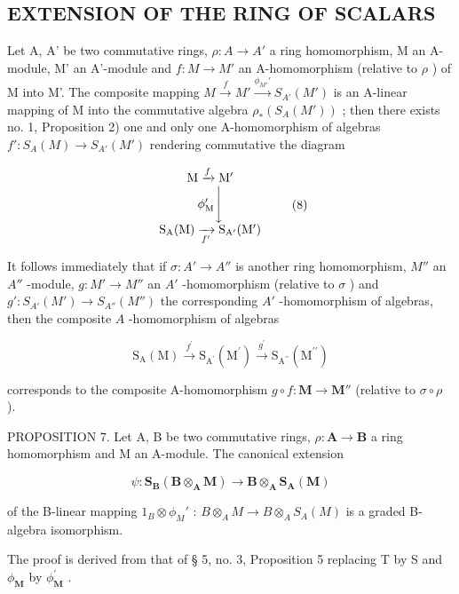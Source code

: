 \subsection{EXTENSION OF THE RING OF SCALARS}

Let A, A' be two commutative rings, \(\rho: A \to A'\) a ring homomorphism, M an A-module, M' an A'-module and \(f: M \to M'\) an A-homomorphism (relative to \(\rho\) ) of M into M'. The composite mapping \(M \xrightarrow{f} M' \xrightarrow{\phi_{M'}'} S_{A'}(M')\) is an A-linear mapping of M into the commutative algebra \(\rho_*(S_A(M'))\) ; then there exists no. 1, Proposition 2) one and only one A-homomorphism of algebras \(f': S_A(M) \to S_{A'}(M')\) rendering commutative the diagram

\[
\begin{array}{c} \mathrm{M} \xrightarrow {f} \mathrm{M} ^ {\prime} \\ \phi_ {\mathrm{M}} ^ {\prime} \Biggl \downarrow \\ \mathrm{S} _ {\mathrm{A}} (\mathrm{M}) \xrightarrow [ f ^ {\prime} ]{} \mathrm{S} _ {\mathrm{A} ^ {\prime}} (\mathrm{M} ^ {\prime}) \end{array}\tag{8}
\]

It follows immediately that if \(\sigma: A' \to A''\) is another ring homomorphism, \(M''\) an \(A''\) -module, \(g: M' \to M''\) an \(A'\) -homomorphism (relative to \(\sigma\) ) and \(g': S_{A'}(M') \to S_{A''}(M'')\) the corresponding \(A'\) -homomorphism of algebras, then the composite \(A\) -homomorphism of algebras

\[
\mathrm{S} _ {\mathrm{A}} (\mathrm{M}) \xrightarrow {f ^ {\prime}} \mathrm{S} _ {\mathrm{A} ^ {\prime}} \left(\mathrm{M} ^ {\prime}\right) \xrightarrow {g ^ {\prime}} \mathrm{S} _ {\mathrm{A} ^ {\prime \prime}} \left(\mathrm{M} ^ {\prime \prime}\right)\tag{9}
\]

corresponds to the composite A-homomorphism \(g \circ f: \mathbf{M} \to \mathbf{M}''\) (relative to \(\sigma \circ \rho\) ).

PROPOSITION 7. Let A, B be two commutative rings, \(\rho: \mathbf{A} \to \mathbf{B}\) a ring homomorphism and M an A-module. The canonical extension

\[
\psi \colon \mathbf {S} _ {\mathbf {B}} (\mathbf {B} \otimes_ {\mathbf {A}} \mathbf {M}) \rightarrow \mathbf {B} \otimes_ {\mathbf {A}} \mathbf {S} _ {\mathbf {A}} (\mathbf {M})
\]

of the B-linear mapping \(1_{B} \otimes \phi_{M}'\) : \(B \otimes_{A} M \to B \otimes_{A} S_{A}(M)\) is a graded B-algebra isomorphism.

The proof is derived from that of § 5, no. 3, Proposition 5 replacing T by S and \(\phi_{\mathbf{M}}\) by \(\phi_{\mathbf{M}}^{\prime}\) .


